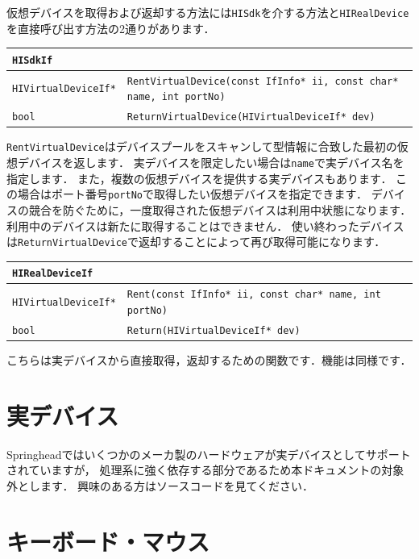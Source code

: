 \KLUDGE 仮想デバイスを取得および返却する方法には\texttt{HISdk}を介する方法と\texttt{HIRealDevice}を直接呼び出す方法の2通りがあります．
\begin{center}
\begin{tabular}{p{.25\hsize}p{.65\hsize}}
\texttt{HISdkIf}																							\\ \midrule
\texttt{HIVirtualDeviceIf*} & \texttt{RentVirtualDevice(const IfInfo* ii, const char* name, int portNo)}	\\
\texttt{bool}				& \texttt{ReturnVirtualDevice(HIVirtualDeviceIf* dev)}	\\
\end{tabular}
\end{center}
\texttt{RentVirtualDevice}はデバイスプールをスキャンして型情報に合致した最初の仮想デバイスを返します．
\KLUDGE 実デバイスを限定したい場合は\texttt{name}で実デバイス名を指定します．
\KLUDGE また，複数の仮想デバイスを提供する実デバイスもあります．
\KLUDGE この場合はポート番号\texttt{portNo}で取得したい仮想デバイスを指定できます．
\KLUDGE %
\KLUDGE デバイスの競合を防ぐために，一度取得された仮想デバイスは利用中状態になります．
\KLUDGE 利用中のデバイスは新たに取得することはできません．
\KLUDGE 使い終わったデバイスは\texttt{ReturnVirtualDevice}で返却することによって再び取得可能になります．
\begin{center}
\begin{tabular}{p{.25\hsize}p{.65\hsize}}
\texttt{HIRealDeviceIf}																				\\ \midrule
\texttt{HIVirtualDeviceIf*}	& \texttt{Rent(const IfInfo* ii, const char* name, int portNo)}	\\
\texttt{bool}				& \texttt{Return(HIVirtualDeviceIf* dev)}
\end{tabular}
\end{center}
\KLUDGE こちらは実デバイスから直接取得，返却するための関数です．機能は同様です．


\section{実デバイス}

Springheadではいくつかのメーカ製のハードウェアが実デバイスとしてサポートされていますが，
\KLUDGE 処理系に強く依存する部分であるため本ドキュメントの対象外とします．
\KLUDGE 興味のある方はソースコードを見てください．

\section{キーボード・マウス}
\label{sec_hi_keymouse}

